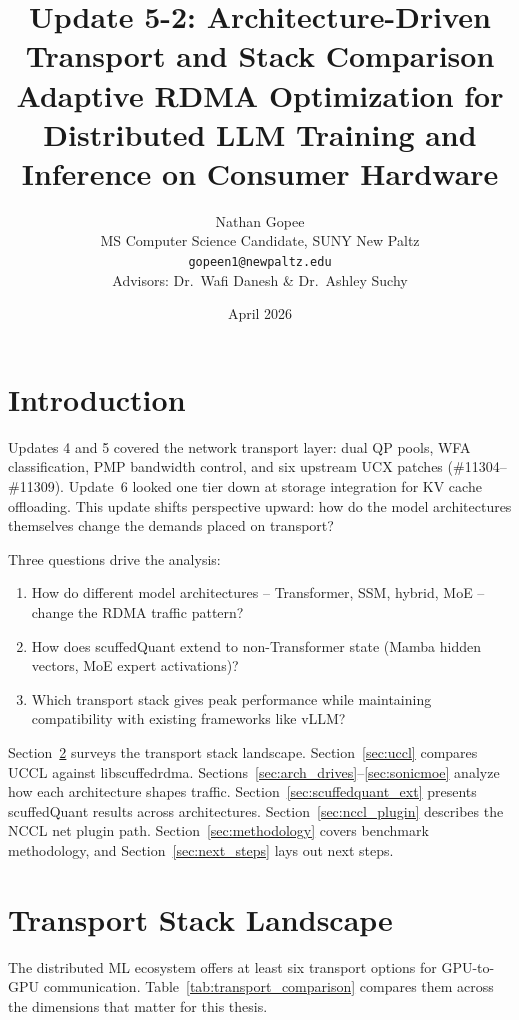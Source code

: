 \documentclass[11pt,letterpaper]{article}
\title{Update 5-2: Architecture-Driven Transport and Stack Comparison\\[4pt]
\large Adaptive RDMA Optimization for Distributed LLM Training and Inference on Consumer Hardware}
\author{Nathan Gopee\\MS Computer Science Candidate, SUNY New Paltz\\\texttt{gopeen1@newpaltz.edu}\\[4pt]Advisors: Dr.\ Wafi Danesh \& Dr.\ Ashley Suchy}
\date{April 2026}
\begin{document}
\maketitle
\tableofcontents
\newpage

\section{Introduction}
\label{sec:intro}

Updates 4 and 5 covered the network transport layer: dual QP pools, WFA classification, PMP bandwidth control, and six upstream UCX patches (\#11304--\#11309). Update~6 looked one tier down at storage integration for KV cache offloading. This update shifts perspective upward: how do the model architectures themselves change the demands placed on transport?

Three questions drive the analysis:
\begin{enumerate}
\item How do different model architectures -- Transformer, SSM, hybrid, MoE -- change the RDMA traffic pattern?
\item How does scuffedQuant extend to non-Transformer state (Mamba hidden vectors, MoE expert activations)?
\item Which transport stack gives peak performance while maintaining compatibility with existing frameworks like vLLM?
\end{enumerate}

Section~\ref{sec:transport_stack} surveys the transport stack landscape. Section~\ref{sec:uccl} compares UCCL against libscuffedrdma. Sections~\ref{sec:arch_drives}--\ref{sec:sonicmoe} analyze how each architecture shapes traffic. Section~\ref{sec:scuffedquant_ext} presents scuffedQuant results across architectures. Section~\ref{sec:nccl_plugin} describes the NCCL net plugin path. Section~\ref{sec:methodology} covers benchmark methodology, and Section~\ref{sec:next_steps} lays out next steps.

\section{Transport Stack Landscape}
\label{sec:transport_stack}

The distributed ML ecosystem offers at least six transport options for GPU-to-GPU communication. Table~\ref{tab:transport_comparison} compares them across the dimensions that matter for this thesis.
\end{document}
